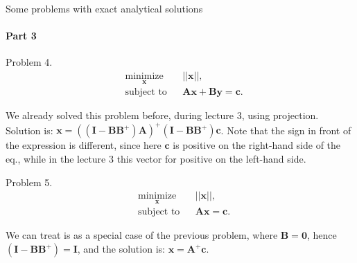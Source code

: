 \documentclass{beamer}
\begin{document}
\begin{frame}{Some problems with exact analytical solutions}
\framesubtitle{Part 3}
\begin{flushleft}

Problem 4. 
%
\begin{equation}
\begin{aligned}
& \underset{\mathbf{x}}{\text{minimize}}
& & || \mathbf{x} ||, \\
& \text{subject to}
& & \mathbf{A} \mathbf{x} + \mathbf{B} \mathbf{y} = \mathbf{c}.
\end{aligned}
\end{equation}

We already solved this problem before, during lecture 3, using projection. Solution is: $\mathbf{x} = ((\mathbf{I} - \mathbf{B}\mathbf{B}^+) \mathbf{A})^+(\mathbf{I} - \mathbf{B}\mathbf{B}^+) \mathbf{c}$. Note that the sign in front of the expression is different, since here $\mathbf{c}$ is positive on the right-hand side of the eq., while in the lecture 3 this vector for positive on the left-hand side. 

\bigskip

Problem 5. 
%
\begin{equation}
\begin{aligned}
& \underset{\mathbf{x}}{\text{minimize}}
& & || \mathbf{x} ||, \\
& \text{subject to}
& & \mathbf{A} \mathbf{x} = \mathbf{c}.
\end{aligned}
\end{equation}

We can treat is as a special case of the previous problem, where $\mathbf{B} = \mathbf{0}$, hence $(\mathbf{I} - \mathbf{B}\mathbf{B}^+) = \mathbf{I}$, and the solution is: $\mathbf{x} = \mathbf{A}^+\mathbf{c}$.

\end{flushleft}
\end{frame}
\end{document}
